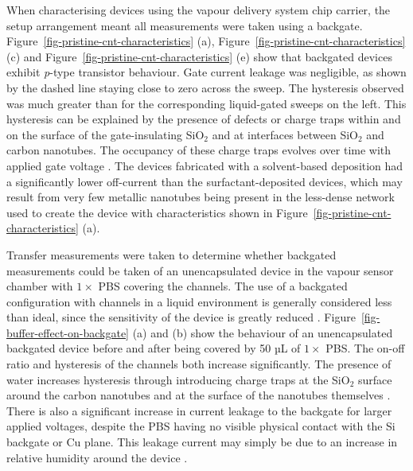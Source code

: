 \documentclass[
  a4paper,
]{scrbook}
\begin{document}
When characterising devices using the vapour delivery system chip
carrier, the setup arrangement meant all measurements were taken using a
backgate. Figure~\ref{fig-pristine-cnt-characteristics} (a),
Figure~\ref{fig-pristine-cnt-characteristics} (c) and
Figure~\ref{fig-pristine-cnt-characteristics} (e) show that backgated
devices exhibit \emph{p}-type transistor behaviour. Gate current leakage
was negligible, as shown by the dashed line staying close to zero across
the sweep. The hysteresis observed was much greater than for the
corresponding liquid-gated sweeps on the left. This hysteresis can be
explained by the presence of defects or charge traps within and on the
surface of the gate-insulating SiO\(_2\) and at interfaces between
SiO\(_2\) and carbon nanotubes. The occupancy of these charge traps
evolves over time with applied gate voltage
\autocite{Lee2007,Lee2012,Ha2014}. The devices fabricated with a
solvent-based deposition had a significantly lower off-current than the
surfactant-deposited devices, which may result from very few metallic
nanotubes being present in the less-dense network \autocite{Rouhi2011}
used to create the device with characteristics shown in
Figure~\ref{fig-pristine-cnt-characteristics} (a).

Transfer measurements were taken to determine whether backgated
measurements could be taken of an unencapsulated device in the vapour
sensor chamber with \(1 \times\) PBS covering the channels. The use of a
backgated configuration with channels in a liquid environment is
generally considered less than ideal, since the sensitivity of the
device is greatly reduced \autocite{Li2023}.
Figure~\ref{fig-buffer-effect-on-backgate} (a) and (b) show the
behaviour of an unencapsulated backgated device before and after being
covered by 50 µL of \(1 \times\) PBS. The on-off ratio and hysteresis of
the channels both increase significantly. The presence of water
increases hysteresis through introducing charge traps at the SiO\(_2\)
surface around the carbon nanotubes and at the surface of the nanotubes
themselves \autocite{Kim2003,Lee2007,Franklin2012,Ha2014}. There is also
a significant increase in current leakage to the backgate for larger
applied voltages, despite the PBS having no visible physical contact
with the Si backgate or Cu plane. This leakage current may simply be due
to an increase in relative humidity around the device
\autocite{Conseil2014}.
\end{document}
